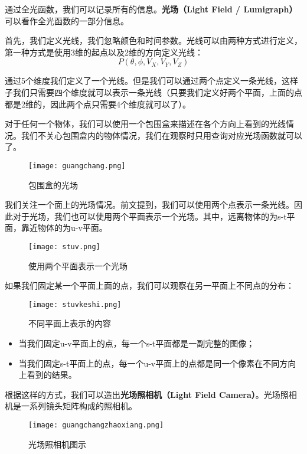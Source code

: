 \documentclass[openany]{progbookcn}
\begin{document}
通过全光函数，我们可以记录所有的信息。\textbf{光场（Light Field / Lumigraph）}可以看作全光函数的一部分信息。

首先，我们定义光线，我们忽略颜色和时间参数。光线可以由两种方式进行定义，第一种方式是使用3维的起点以及2维的方向定义光线：
\begin{equation}
	P(\theta,\phi,V_X,V_Y,V_Z)
\end{equation}

通过5个维度我们定义了一个光线。但是我们可以通过两个点定义一条光线，这样子我们只需要四个维度就可以表示一条光线（只要我们定义好两个平面，上面的点都是2维的，因此两个点只需要4个维度就可以了）。

对于任何一个物体，我们可以使用一个包围盒来描述在各个方向上看到的光线情况。我们不关心包围盒内的物体情况，我们在观察时只用查询对应光场函数就可以了。

\begin{figure}[H]
	\centering
	\texttt{[image: guangchang.png]}
	\caption{包围盒的光场}
	\label{fig:guangchang}
\end{figure}

我们关注一个面上的光场情况。前文提到，我们可以使用两个点表示一条光线。因此对于光场，我们也可以使用两个平面表示一个光场。其中，远离物体的为s-t平面，靠近物体的为u-v平面。

\begin{figure}[H]
	\centering
	\texttt{[image: stuv.png]}
	\caption{使用两个平面表示一个光场}
	\label{fig:stuv}
\end{figure}

如果我们固定某一个平面上面的点，我们可以观察在另一平面上不同点的分布：

\begin{figure}[H]
	\centering
	\texttt{[image: stuvkeshi.png]}
	\caption{不同平面上表示的内容}
	\label{fig:stuvkeshi}
\end{figure}

\begin{itemize}
	\item 当我们固定u-v平面上的点，每一个s-t平面都是一副完整的图像；
	\item 当我们固定s-t平面上的点，每一个u-v平面上的点都是同一个像素在不同方向上看到的结果。
\end{itemize}

根据这样的方式，我们可以造出\textbf{光场照相机（Light Field Camera）}。光场照相机是一系列镜头矩阵构成的照相机。

\begin{figure}[H]
	\centering
	\texttt{[image: guangchangzhaoxiang.png]}
	\caption{光场照相机图示}
	\label{fig:guangchangzhaoxiang}
\end{figure}
\end{document}
